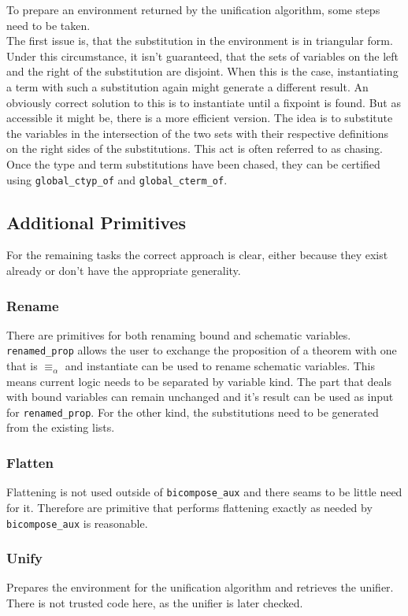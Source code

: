 To prepare an environment returned by the unification algorithm, some steps need to be taken.\\
The first issue is, that the substitution in the environment is in triangular form. Under this circumstance, it isn't guaranteed, that the sets of variables on the left and the right of the substitution are disjoint. When this is the case, instantiating a term with such a substitution again might generate a different result. An obviously correct solution to this is to instantiate until a fixpoint is found. But as accessible it might be, there is a more efficient version. The idea is to substitute the variables in the intersection of the two sets with their respective definitions on the right sides of the substitutions. This act is often referred to as chasing. Once the type and term substitutions have been chased, they can be certified using \texttt{global\_ctyp\_of} and \texttt{global\_cterm\_of}.

\subsection{Additional Primitives}

For the remaining tasks the correct approach is clear, either because they exist already or don't have the appropriate generality.

\subsubsection{Rename} There are primitives for both renaming bound and schematic variables. \texttt{renamed\_prop} allows the user to exchange the proposition of a theorem with one that is $\equiv_\alpha$ and instantiate can be used to rename schematic variables. This means current logic needs to be separated by variable kind. The part that deals with bound variables can remain unchanged and it's result can be used as input for \texttt{renamed\_prop}. For the other kind, the substitutions need to be generated from the existing lists.
\subsubsection{Flatten} Flattening is not used outside of \texttt{bicompose\_aux} and there seams to be little need for it. Therefore are primitive that performs flattening exactly as needed by \texttt{bicompose\_aux} is reasonable.
\subsubsection{Unify} Prepares the environment for the unification algorithm and retrieves the unifier. There is not trusted code here, as the unifier is later checked.
